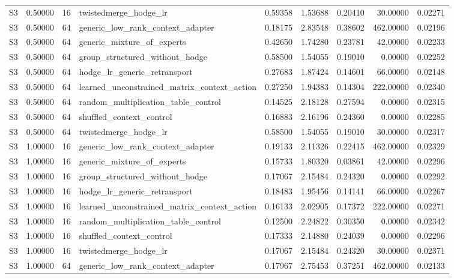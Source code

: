\begin{tabular}{lrrlrrrrr}
S3 & 0.50000 & 16 & twistedmerge_hodge_lr & 0.59358 & 1.53688 & 0.20410 & 30.00000 & 0.02271 \\
S3 & 0.50000 & 64 & generic_low_rank_context_adapter & 0.18175 & 2.83548 & 0.38602 & 462.00000 & 0.02196 \\
S3 & 0.50000 & 64 & generic_mixture_of_experts & 0.42650 & 1.74280 & 0.23781 & 42.00000 & 0.02233 \\
S3 & 0.50000 & 64 & group_structured_without_hodge & 0.58500 & 1.54055 & 0.19010 & 0.00000 & 0.02252 \\
S3 & 0.50000 & 64 & hodge_lr_generic_retransport & 0.27683 & 1.87424 & 0.14601 & 66.00000 & 0.02148 \\
S3 & 0.50000 & 64 & learned_unconstrained_matrix_context_action & 0.27250 & 1.94383 & 0.14304 & 222.00000 & 0.02340 \\
S3 & 0.50000 & 64 & random_multiplication_table_control & 0.14525 & 2.18128 & 0.27594 & 0.00000 & 0.02315 \\
S3 & 0.50000 & 64 & shuffled_context_control & 0.16883 & 2.16196 & 0.24360 & 0.00000 & 0.02285 \\
S3 & 0.50000 & 64 & twistedmerge_hodge_lr & 0.58500 & 1.54055 & 0.19010 & 30.00000 & 0.02317 \\
S3 & 1.00000 & 16 & generic_low_rank_context_adapter & 0.19133 & 2.11326 & 0.22415 & 462.00000 & 0.02329 \\
S3 & 1.00000 & 16 & generic_mixture_of_experts & 0.15733 & 1.80320 & 0.03861 & 42.00000 & 0.02296 \\
S3 & 1.00000 & 16 & group_structured_without_hodge & 0.17067 & 2.15484 & 0.24320 & 0.00000 & 0.02292 \\
S3 & 1.00000 & 16 & hodge_lr_generic_retransport & 0.18483 & 1.95456 & 0.14141 & 66.00000 & 0.02267 \\
S3 & 1.00000 & 16 & learned_unconstrained_matrix_context_action & 0.16133 & 2.02905 & 0.17372 & 222.00000 & 0.02271 \\
S3 & 1.00000 & 16 & random_multiplication_table_control & 0.12500 & 2.24822 & 0.30350 & 0.00000 & 0.02342 \\
S3 & 1.00000 & 16 & shuffled_context_control & 0.17333 & 2.14880 & 0.24039 & 0.00000 & 0.02296 \\
S3 & 1.00000 & 16 & twistedmerge_hodge_lr & 0.17067 & 2.15484 & 0.24320 & 30.00000 & 0.02371 \\
S3 & 1.00000 & 64 & generic_low_rank_context_adapter & 0.17967 & 2.75453 & 0.37251 & 462.00000 & 0.02133 \\

\end{tabular}
